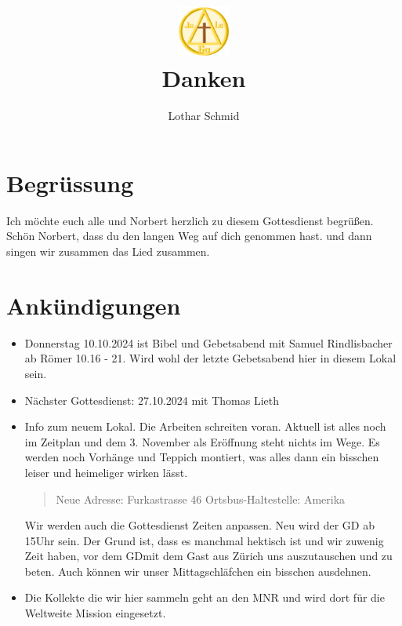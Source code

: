 \documentclass[12pt,a4paper]{scrarticle}
\title{\includegraphics[height=48pt]{assets/images/logo.png}\\Danken}
\author{Lothar Schmid}
\begin{document}
\maketitle
\section{Begrüssung}

Ich möchte euch alle und Norbert herzlich zu diesem Gottesdienst begrüßen.
Schön Norbert, dass du den langen Weg auf dich genommen hast. 
\beten{} und dann singen wir zusammen das Lied  zusammen.

\section{Ankündigungen}
\begin{itemize}
    \item Donnerstag 10.10.2024 ist Bibel und Gebetsabend mit Samuel Rindlisbacher ab Römer 10.16 - 21. Wird wohl der letzte Gebetsabend hier in diesem Lokal sein.
    \item Nächster Gottesdienst: 27.10.2024 mit Thomas Lieth
    \item Info zum neuem Lokal. Die Arbeiten schreiten voran. Aktuell ist alles noch im Zeitplan und dem 3. November als Eröffnung steht nichts im Wege. Es werden noch Vorhänge und Teppich montiert, was alles dann ein bisschen leiser und heimeliger wirken lässt.
    \begin{quote}
        Neue Adresse:
        Furkastrasse 46
        Ortsbus-Haltestelle: Amerika
    \end{quote}
    Wir werden auch die Gottesdienst Zeiten anpassen. Neu wird der GD ab 15Uhr sein. Der Grund ist, dass es manchmal hektisch ist und wir zuwenig Zeit haben, vor dem GDmit dem Gast aus Zürich uns auszutauschen und zu beten. Auch können wir unser Mittagschläfchen ein bisschen ausdehnen.
    \item Die Kollekte die wir hier sammeln geht an den MNR und wird dort für die Weltweite Mission eingesetzt.    
\end{itemize}
\end{document}
